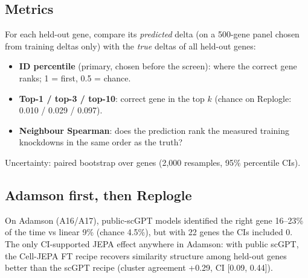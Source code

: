\documentclass[11pt]{article}
\begin{document}
\subsection{Metrics}
For each held-out gene, compare its \emph{predicted} delta (on a 500-gene panel chosen from training deltas only) with the \emph{true} deltas of all held-out genes:
\begin{itemize}
\item \textbf{ID percentile} (primary, chosen before the screen): where the correct gene ranks; 1 = first, 0.5 = chance.
\item \textbf{Top-1 / top-3 / top-10}: correct gene in the top $k$ (chance on Replogle: 0.010 / 0.029 / 0.097).
\item \textbf{Neighbour Spearman}: does the prediction rank the measured training knockdowns in the same order as the truth?
\end{itemize}
Uncertainty: paired bootstrap over genes (2,000 resamples, 95\% percentile CIs).

\subsection{Adamson first, then Replogle}
On Adamson (A16/A17), public-scGPT models identified the right gene 16--23\% of the time vs linear 9\% (chance 4.5\%), but with 22 genes the CIs included 0. The only CI-supported JEPA effect anywhere in Adamson: with public scGPT, the Cell-JEPA FT recipe recovers similarity structure among held-out genes better than the scGPT recipe (cluster agreement +0.29, CI [0.09, 0.44]).
\end{document}
